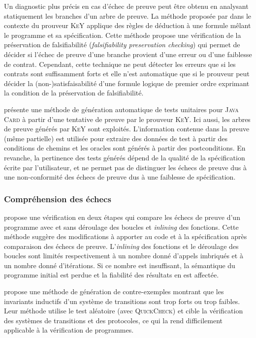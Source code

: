 Un diagnostic plus précis en cas d'échec de preuve peut être obtenu en analysant
statiquement les branches d'un arbre de preuve.
La méthode proposée par \cite{Gladisch/TAP09} dans le contexte du prouveur
\textsc{KeY} applique des règles de déduction à une formule mêlant le programme
et sa spécification.
Cette méthode propose une vérification de la préservation de falsifiabilité
({\em falsifiability preservation checking}) qui permet de décider si l'échec
de preuve d'une branche provient d'une erreur ou d'une faiblesse de contrat.
Cependant, cette technique ne peut détecter les erreurs que si les contrats sont
suffisamment forts et elle n'est automatique que si le prouveur peut décider la
(non-)satisfaisabilité d'une formule logique de premier ordre exprimant la
condition de la préservation de falsifiabilité.

\cite{Engel/TAP07} présente une méthode de génération automatique de tests
unitaires pour \textsc{Java Card} à partir d'une tentative de preuve par le
prouveur \textsc{KeY}.
Ici aussi, les arbres de preuve générés par \textsc{KeY} sont exploités.
L'information contenue dans la preuve (même partielle) est utilisée
pour extraire des données de test à partir des conditions de chemins et les
oracles sont générés à partir des postconditions.
En revanche, la pertinence des tests générés dépend de la qualité de la
spécification écrite par l'utilisateur, et ne permet pas de distinguer les
échecs de preuve dus à une non-conformité des échecs de preuve dus à une
faiblesse de spécification.


\subsubsection*{Compréhension des échecs}


\cite{Tschannen/14} propose une vérification en deux étapes qui compare les
échecs de preuve d'un programme \eiffel avec et sans déroulage des boucles et
{\em inlining} des fonctions.
Cette méthode suggère des modifications à apporter au code et à la spécification
après comparaison des échecs de preuve.
L'{\em inlining} des fonctions et le déroulage des boucles sont limités
respectivement à un nombre donné d'appels imbriqués et à un nombre donné
d'itérations.
Si ce nombre est insuffisant, la sémantique du programme initial est perdue et
la fiabilité des résultats en est affectée.

\cite{Claessen/TAP08} propose une méthode de génération de contre-exemples
montrant que les invariants inductifs d'un système de transitions sont trop
forts ou trop faibles.
Leur méthode utilise le test aléatoire (avec \textsc{QuickCheck}) et cible
la vérification des systèmes de transitions et des protocoles, ce qui
la rend difficilement applicable à la vérification de programmes.


